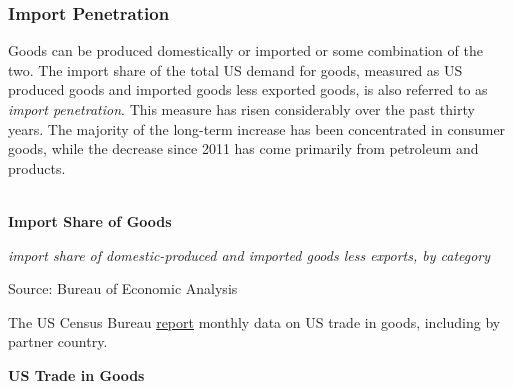 \documentclass{report}
\makeatletter
\newcommand{\tbllink}[1]{\href{https://raw.githubusercontent.com/bdecon/US-chartbook/master/chartbook/data/#1}{\faTable}}
\newcommand*\short[1]{\expandafter\@gobbletwo\number\numexpr#1\relax}
\newcommand{\sbar}[4]{
		\addplot[ybar stacked, bar width=2.6pt, draw opacity=0, fill=#1] 
			table [x=#2, y=#3, col sep=comma]{#4};}
\newcommand{\dateaxisticks}{
		date coordinates in=x, axis line style={draw=none},
		xmax={2020-10-01},
		max space between ticks=40,	    
		xtick={{1990-01-01}, {1992-01-01}, {1994-01-01}, 
			{1996-01-01}, {1998-01-01}, {2000-01-01}, 
			{2002-01-01}, {2004-01-01}, {2006-01-01},
			{2008-01-01}, {2010-01-01}, {2012-01-01}, {2014-01-01},
		    {2016-01-01}, {2018-01-01}, {2020-01-01}},
		minor xtick={{1989-01-01}, {1991-01-01}, {1993-01-01},
			{1995-01-01}, {1997-01-01}, {1999-01-01}, 
			{2001-01-01}, {2003-01-01}, {2005-01-01}, {2007-01-01},
		    {2009-01-01}, {2011-01-01}, {2013-01-01}, {2015-01-01},
		    {2017-01-01}, {2019-01-01}},
		enlarge y limits={0.06}, enlarge x limits={0.01},
		}
\newcommand{\bbar}[2]{extra #1 ticks = {{#2}}, extra #1 tick labels = ,
		extra #1 tick style = {grid=major, grid style={thick, black!25}},}
\newcommand{\rbars}{
		\fill[color=black!10] (axis cs:{1990-07-01},\pgfkeysvalueof{/pgfplots/ymin}) rectangle 
			(axis cs:{1991-03-01}, \pgfkeysvalueof{/pgfplots/ymax});
		\fill[color=black!10] (axis cs:{2007-12-01},\pgfkeysvalueof{/pgfplots/ymin}) rectangle 
			(axis cs:{2009-07-01}, \pgfkeysvalueof{/pgfplots/ymax});
		\fill[color=black!10] (axis cs:{2001-03-01},\pgfkeysvalueof{/pgfplots/ymin}) rectangle 
			(axis cs:{2001-11-01}, \pgfkeysvalueof{/pgfplots/ymax});
		\fill[color=black!10] (axis cs:{2020-02-01},\pgfkeysvalueof{/pgfplots/ymin}) rectangle 
			(axis cs:{2020-10-01}, \pgfkeysvalueof{/pgfplots/ymax});}
\makeatother
\begin{document}
{{{{{{\newpage
\subsubsection*{\color{black!70} \seriffont Import Penetration}
\begin{minipage}{0.76\textwidth}
\small Goods can be produced domestically or imported or some combination of the two. The import share of the total US demand for goods, measured as US produced goods and imported goods less exported goods, is also referred to as \textit{import penetration}. This measure has risen considerably over the past thirty years. The majority of the long-term increase has been concentrated in consumer goods, while the decrease since 2011 has come primarily from petroleum and products. \\

 \\



\vspace{3mm}

\normalsize \textbf{Import Share of Goods}

\footnotesize{\textit{import share of domestic-produced and imported goods less exports, by category}}

\hspace*{-2mm} 

\footnotesize{Source: Bureau of Economic Analysis} \hfill \tbllink{goodsimpsh.csv}
\end{minipage}
\newpage
\begin{minipage}{0.76\textwidth}
\small The US Census Bureau \href{https://www.census.gov/foreign-trade/data/index.html}{report} monthly data on US trade in goods, including by partner country.  
\vspace{4mm}

\normalsize \textbf{US Trade in Goods} \hspace{14mm}  \hspace{24mm} 


\end{minipage}}}}}}}
\end{document}
